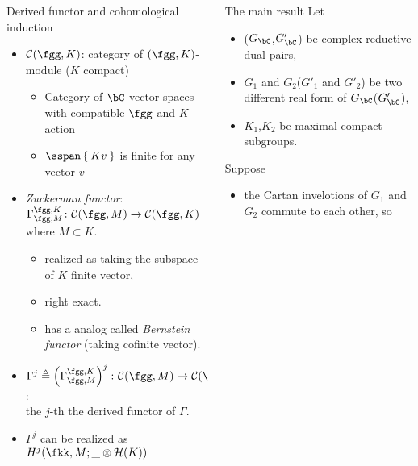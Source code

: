 \documentclass[final,hyperref={pdfpagelabels=false}]{beamer} %
\def\cC{\mathcal{C}}
\begin{document}
\begin{frame}
\begin{columns}
\begin{column}{.49\textwidth}
\begin{block}{Derived functor and cohomological induction}
  \begin{itemize}
     \item $\cC(\fgg,K)$: category of $(\fgg, K)$-module ($K$ compact)
      \begin{itemize}
      \item Category of $\bC$-vector spaces  with compatible $\fgg$ and $K$ action
      \item $\sspan\Set{Kv}$ is finite for any vector $v$  
      \end{itemize}
    \item {\em Zuckerman functor}: $\Gamma_{\fgg,M}^{\fgg,K}
      \colon \cC(\fgg,M)\to \cC(\fgg,K)$ 
      where $M\subset K$.
      \begin{itemize}
      \item realized as taking the subspace of $K$ finite vector,
      \item right exact.
      \item has a analog called {\em Bernstein functor} (taking cofinite vector).
      \end{itemize}
    \item $\Gamma^j\triangleq\left(\Gamma_{\fgg,M}^{\fgg,K}\right)^j
      \colon \cC(\fgg,M)\to \cC(\fgg,K)$:\\
      the $j$-th the derived functor of $\Gamma$.
    \item $\Gamma^j$ can be realized as $H^j(\fkk,M; \_ \otimes \mathcal{H}(K))$
    \end{itemize}
\end{block}
\end{column}
  \begin{column}{.49\textwidth}
    \begin{block}{The main result}
      Let
      \begin{itemize}
      \item ($G_\bC$,$G'_\bC$) be complex reductive dual pairs,
      \item $G_1$ and $G_2$($G'_1$ and $G'_2$) 
        be two different real form of $G_\bC$($G'_\bC$),
     \item $K_1$,$K_2$ be maximal compact subgroups.
     \end{itemize}
     Suppose
     \begin{itemize}
     \item the Cartan invelotions of $G_1$ and $G_2$ commute to each other, so
        \begin{itemize}

\end{itemize}
\end{itemize}
\end{block}
\end{column}
\end{columns}
\end{frame}
\end{document}

